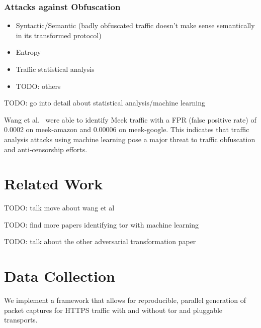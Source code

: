 \subsubsection{Attacks against Obfuscation}
\begin{itemize}
    \item Syntactic/Semantic (badly obfuscated traffic doesn't make sense semantically in its transformed protocol)
    \item Entropy
    \item Traffic statistical analysis
    \item TODO: others
\end{itemize}

TODO: go into detail about statistical analysis/machine learning

Wang et al.~\cite{Wang:2015:STN:2810103.2813715} were able to identify Meek traffic with a FPR (false positive rate) of 0.0002 on meek-amazon and 0.00006 on meek-google. This indicates that traffic analysis attacks using machine learning pose a major threat to traffic obfuscation and anti-censorship efforts.

\section{Related Work}
TODO: talk move about wang et al

TODO: find more papers identifying tor with machine learning

TODO: talk about the other adversarial transformation paper

\section{Data Collection}
We implement a framework that allows for reproducible, parallel generation of packet captures for HTTPS traffic with and without tor and pluggable transports.

